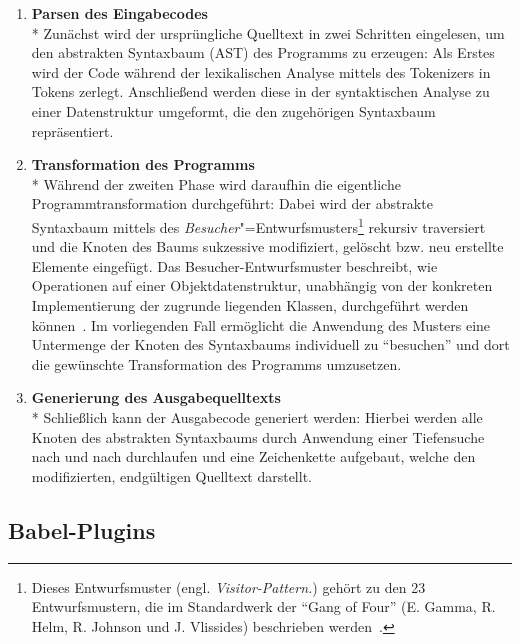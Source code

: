 \begin{enumerate}
  \item \textbf{Parsen des Eingabecodes}\\*
    Zunächst wird der ursprüngliche Quelltext in zwei Schritten eingelesen, um den abstrakten Syntaxbaum (AST) des Programms zu erzeugen: Als Erstes wird der Code während der lexikalischen Analyse mittels des Tokenizers in Tokens zerlegt. Anschließend werden diese in der syntaktischen Analyse zu einer Datenstruktur umgeformt, die den zugehörigen Syntaxbaum repräsentiert.
    \\

  \item \textbf{Transformation des Programms}\\*
    Während der zweiten Phase wird daraufhin die eigentliche Programmtransformation durchgeführt: Dabei wird der abstrakte Syntaxbaum mittels des \textit{Besucher}"=Entwurfsmusters\footnote{Dieses Entwurfsmuster (engl. \textit{Visitor-Pattern.}) gehört zu den 23 Entwurfsmustern, die im Standardwerk  der \enquote{Gang of Four} (E. Gamma, R. Helm, R. Johnson und J. Vlissides) beschrieben werden~\autocite[306\psqq]{GAMMA:1994}.} rekursiv traversiert und die Knoten des Baums sukzessive modifiziert, gelöscht bzw. neu erstellte Elemente eingefügt. Das Besucher-Entwurfsmuster beschreibt, wie Operationen auf einer Objektdatenstruktur, unabhängig von der konkreten Implementierung der zugrunde liegenden Klassen, durchgeführt werden können~\autocite[634\psq]{Freeman:2004}. Im vorliegenden Fall ermöglicht die Anwendung des Musters eine Untermenge der Knoten des Syntaxbaums individuell zu \enquote{besuchen} und dort die gewünschte Transformation des Programms umzusetzen.
    \\

  \item \textbf{Generierung des Ausgabequelltexts}\\*
    Schließlich kann der Ausgabecode generiert werden: Hierbei werden alle Knoten des abstrakten Syntaxbaums durch Anwendung einer Tiefensuche nach und nach durchlaufen und eine Zeichenkette aufgebaut, welche den modifizierten, endgültigen Quelltext darstellt.
\end{enumerate}

\subsection{Babel-Plugins}

